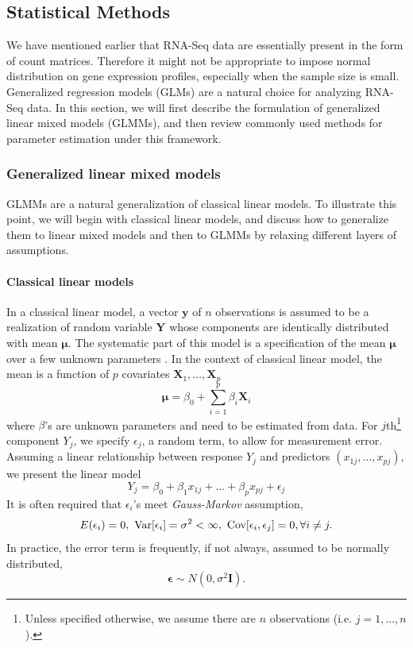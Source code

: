 \subsection{Statistical Methods}\label{subsec:glmm}
We have mentioned earlier that RNA-Seq data are essentially present in the form of count matrices. Therefore it might not be appropriate to impose normal distribution on gene expression profiles, especially when the sample size is small. Generalized regression models (GLMs) are a natural choice for 
analyzing RNA-Seq data.
In this section, we will first describe the formulation of generalized linear mixed models (GLMMs),
and then review commonly used methods for parameter estimation under this framework.

\subsubsection{Generalized linear mixed models}\label{subsubsec:intro-stat-framework}
GLMMs are a natural generalization of classical linear models. To illustrate this point, we will
begin with classical linear models, and discuss how to generalize them to linear mixed models and
then to GLMMs by relaxing different layers of assumptions. 
\paragraph{Classical linear models}\label{para:clm}
In a classical linear model, a vector $\bm y$ of $n$ observations is assumed to be a realization
of random variable $\bm Y$ whose components are identically distributed with mean $\bm \mu$. The
systematic part of this model is a specification of the mean $\bm\mu$ over a few unknown parameters
\citep{mccullagh1989generalized}. In the context of classical linear model, the mean is a function
of $p$ covariates $\bm X_1, \ldots, \bm X_p$
\begin{equation}\label{eq:clm}
	\bm \mu =\beta_0 + \sum_{i=1}^p\beta_i \bm X_i
\end{equation}	
where $\beta$'s are unknown parameters and need to be estimated from data. For
$j$th\footnote{Unless specified otherwise, we assume there are $n$ observations (i.e. $j=1, \ldots
	,n$).} component $Y_j$, we specify $\epsilon_j$, a random term, to allow for measurement error.
Assuming a linear relationship between response $Y_j$ and predictors $(x_{1j}, \ldots, x_{pj})$, we
present the linear model 
\begin{equation}\label{eq:clm2}
	Y_j= \beta_0 + \beta_1x_{1j} + \ldots + \beta_p x_{pj} + \epsilon_j
\end{equation}
It is often required that $\epsilon_i$'s meet \textit{Gauss-Markov} assumption,
\begin{equation}\label{eq:gauss-markov}
	E(\epsilon_i)=0,~ \text{Var}[\epsilon_i]=
	\sigma^2<\infty, ~\text{Cov}[\epsilon_i, \epsilon_j]=0, \forall i \neq j.
\end{equation}
In practice, the error term is frequently, if not always, assumed to be normally distributed, 
\begin{equation}\label{eq:normalassumption}
	\bm \epsilon \sim N(0, \sigma^2 \bm I).
\end{equation}

